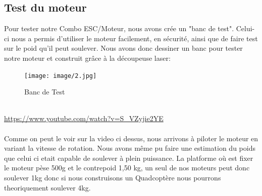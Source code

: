 \documentclass[10pt,a4paper]{article}
\begin{document}
 \subsection{Test du moteur}
 Pour tester notre Combo ESC/Moteur, nous avons crée un "banc de test". Celui-ci nous a permis d'utiliser le moteur facilement, en sécurité, ainsi que de faire test sur le poid qu'il peut soulever. Nous avons donc dessiner un banc pour tester notre moteur et construit grâce à la découpeuse laser: \\
 \begin{figure}[h!]
\centering
\texttt{[image: image/2.jpg]}
\caption{Banc de Test}
\label{fig:net }
\end{figure}\\
\newpage
\url{https://www.youtube.com/watch?v=S_VZyjie2YE}\\
\\Comme on peut le voir sur la video ci dessus,  nous arrivons à piloter le moteur en variant la vitesse de rotation. Nous avons même pu faire une estimation du poids que celui ci etait capable de soulever à plein puissance. La platforme où est fixer le moteur pèse 500g et le contrepoid 1,50 kg, un seul de nos moteurs peut donc soulever 1kg donc si nous construisons un Quadcoptère nous pourrons theoriquement soulever 4kg.

\newpage 
\end{document}
